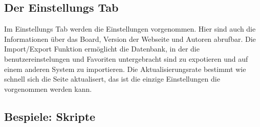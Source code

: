 \subsection{Der Einstellungs Tab}
Im Einstellungs Tab werden die Einstellungen vorgenommen. Hier sind auch die
Informationen über das Board, Version der Webseite und Autoren abrufbar. Die
Import/Export Funktion ermöglicht die Datenbank, in der die benutzereinstelungen
und Favoriten untergebracht sind zu expotieren und auf einem anderen System zu
importieren. Die Aktualisierungsrate bestimmt wie schnell sich die Seite
aktualisert, das ist die einzige Einstellungen die vorgenommen werden kann.

\subsection{Bespiele: Skripte}
